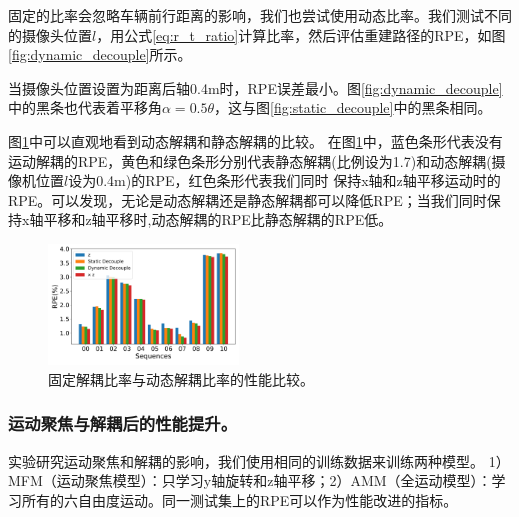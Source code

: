 固定的比率会忽略车辆前行距离的影响，我们也尝试使用动态比率。我们测试不同的摄像头位置$l$，用公式\eqref{eq:r_t_ratio}计算比率，然后评估重建路径的RPE，如图\ref{fig:dynamic_decouple}所示。

当摄像头位置设置为距离后轴0.4m时，RPE误差最小。图\ref{fig:dynamic_decouple}中的黑条也代表着平移角$\alpha=0.5\theta$，这与图\ref{fig:static_decouple}中的黑条相同。

图\ref{fig:decouple}中可以直观地看到动态解耦和静态解耦的比较。
在图\ref{fig:decouple}中，蓝色条形代表没有运动解耦的RPE，黄色和绿色条形分别代表静态解耦(比例设为1.7)和动态解耦(摄像机位置$l$设为0.4m)的RPE，红色条形代表我们同时
保持x轴和z轴平移运动时的RPE。可以发现，无论是动态解耦还是静态解耦都可以降低RPE；当我们同时保持x轴平移和z轴平移时,动态解耦的RPE比静态解耦的RPE低。

\begin{figure}[ht]
    \centering
    \includegraphics[width=0.45\textwidth]{datavo/decouple-crop.pdf}
    \caption{固定解耦比率与动态解耦比率的性能比较。}
    \label{fig:decouple}
\end{figure}
\subsubsection{运动聚焦与解耦后的性能提升。}

\label{sec:ego_improvement}


实验研究运动聚焦和解耦的影响，我们使用相同的训练数据来训练两种模型。
1）MFM（运动聚焦模型）：只学习y轴旋转和z轴平移；2）AMM（全运动模型）：学习所有的六自由度运动。同一测试集上的RPE可以作为性能改进的指标。

